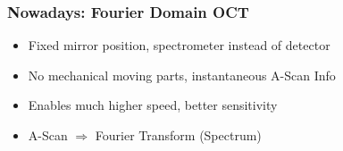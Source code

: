 \begin{frame}
    \frametitle{Nowadays: Fourier Domain OCT}
    \vspace{-0.3cm}
    \begin{itemize}
        \item Fixed mirror position, spectrometer instead of detector
        \item No mechanical moving parts, instantaneous A-Scan Info
        \item Enables much higher speed, better sensitivity
        \item A-Scan $\Rightarrow$ Fourier Transform (Spectrum)
    \end{itemize}


\end{frame}
